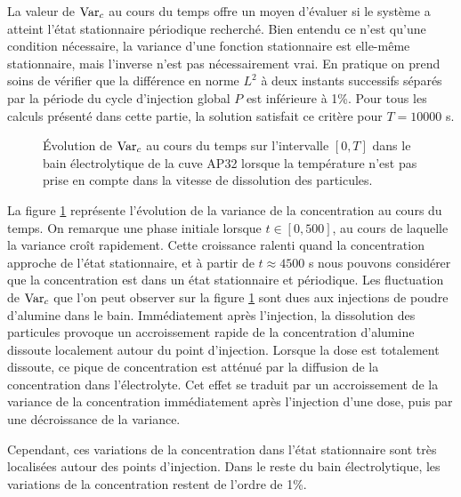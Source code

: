La valeur de $\operatorname{Var}_c$ au cours du temps offre un moyen
d'évaluer si le système a atteint l'état stationnaire périodique
recherché. Bien entendu ce n'est qu'une condition nécessaire, la
variance d'une fonction stationnaire est elle-même stationnaire, mais
l'inverse n'est pas nécessairement vrai. En pratique on prend soins de
vérifier que la différence en norme $L^2$ à deux instants successifs
séparés par la période du cycle d'injection global $P$ est inférieure
à \num{1}\%. Pour tous les calculs présenté dans cette partie, la
solution satisfait ce critère pour $T = \num{10000}$ \si{\second}.

\begin{figure}
  \begin{center}
    
    \caption{Évolution de $\operatorname{Var}_c$ au cours du temps sur
      l'intervalle $[0, T]$ dans le bain électrolytique de la cuve
      AP32 lorsque la température n'est pas prise en compte dans la
      vitesse de dissolution des particules.}
    \label{fig:alumin-control-var}
  \end{center}
\end{figure}

La figure \ref{fig:alumin-control-var} représente l'évolution de
la variance de la concentration au cours du temps. On remarque une
phase initiale lorsque $t\in[0,500]$, au cours de laquelle la variance
croît rapidement. Cette croissance ralenti quand la concentration
approche de l'état stationnaire, et à partir de $t \approx
\num{4500}$ \si{\second} nous pouvons considérer que la
concentration est dans un état stationnaire et périodique. Les
fluctuation de $\operatorname{Var}_c$ que l'on peut observer sur la
figure \ref{fig:alumin-control-var} sont dues aux injections de poudre
d'alumine dans le bain. Immédiatement après l'injection, la
dissolution des particules provoque un accroissement rapide de la
concentration d'alumine dissoute localement autour du point
d'injection. Lorsque la dose est totalement dissoute, ce pique de
concentration est atténué par la diffusion de la concentration
dans l'électrolyte. Cet effet se traduit par un accroissement de la
variance de la concentration immédiatement après l'injection d'une
dose, puis par une décroissance de la variance.

Cependant, ces variations de la concentration dans l'état
stationnaire sont très localisées autour des points d'injection. Dans
le reste du bain électrolytique, les variations de la concentration
restent de l'ordre de \num{1}\%.

